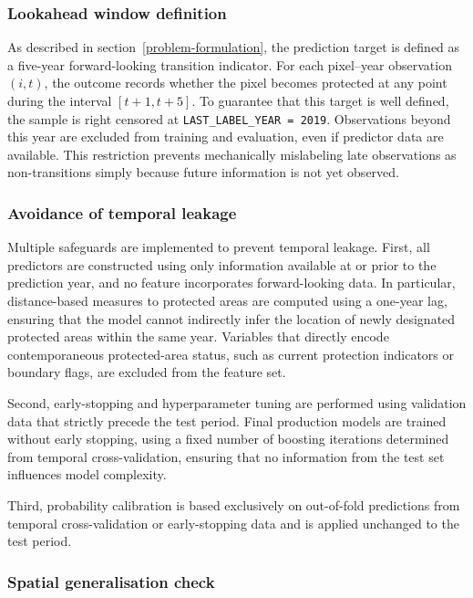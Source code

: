 \documentclass[12pt]{article}
\theoremstyle{break} %
\begin{document}
\subsubsection{Lookahead window definition}
\label{lookahead}

As described in section~\ref{problem-formulation}, the prediction target is defined as a five-year forward-looking transition indicator. For each pixel--year observation $(i,t)$, the outcome records whether the pixel becomes protected at any point during the interval $[t+1, t+5]$. To guarantee that this target is well defined, the sample is right censored at \texttt{LAST\_LABEL\_YEAR = 2019}. Observations beyond this year are excluded from training and evaluation, even if predictor data are available. This restriction prevents mechanically mislabeling late observations as non-transitions simply because future information is not yet observed.

\subsubsection{Avoidance of temporal leakage}
\label{leakage}

Multiple safeguards are implemented to prevent temporal leakage. First, all predictors are constructed using only information available at or prior to the prediction year, and no feature incorporates forward-looking data. In particular, distance-based measures to protected areas are computed using a one-year lag, ensuring that the model cannot indirectly infer the location of newly designated protected areas within the same year. Variables that directly encode contemporaneous protected-area status, such as current protection indicators or boundary flags, are excluded from the feature set.

Second, early-stopping and hyperparameter tuning are performed using validation data that strictly precede the test period. Final production models are trained without early stopping, using a fixed number of boosting iterations determined from temporal cross-validation, ensuring that no information from the test set influences model complexity.

Third, probability calibration is based exclusively on out-of-fold predictions from temporal cross-validation or early-stopping data and is applied unchanged to the test period.

\subsubsection{Spatial generalisation check}
\label{spatial generalisation}
\end{document}

